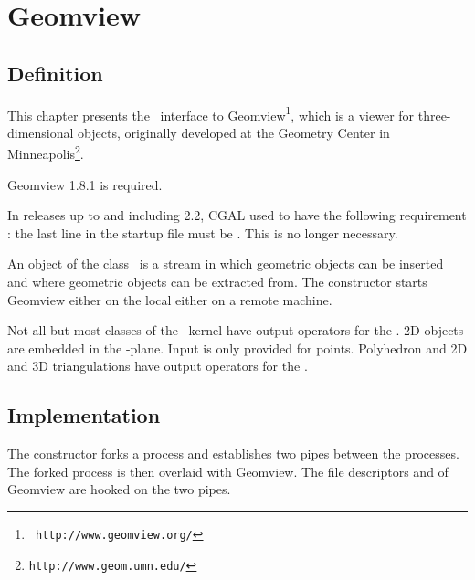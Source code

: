 



\newcommand{\note}[1]{{\bf NOTE: #1}}

\chapter{Geomview} \label{ChapterGeomview}


\section{Definition}

This chapter presents the \cgal\ interface to Geomview\footnote{\tt
http://www.geomview.org/}, which is a
viewer for three-dimensional objects, originally developed at the Geometry
Center in Minneapolis\footnote{\tt http://www.geom.umn.edu/}.

Geomview 1.8.1 is required.

 In releases up to and including 2.2, CGAL used to have
the following requirement : the last line in the startup file 
must be .  This is no longer necessary.


An object of the class \ is a stream in which geometric
objects can be inserted and where geometric objects can be extracted
from. The constructor starts Geomview either on the local either on
a remote machine.



Not all but most classes of the \cgal\ kernel have output
operators for the  . 
2D objects are embedded in the -plane.
Input is only provided for points.
Polyhedron and 2D and 3D triangulations  have output
operators for the  . 


\section{Implementation}

The constructor forks a process and establishes two pipes between the
processes. The forked process is then overlaid with Geomview. The
file descriptors  and  of Geomview are hooked
on the two pipes.


